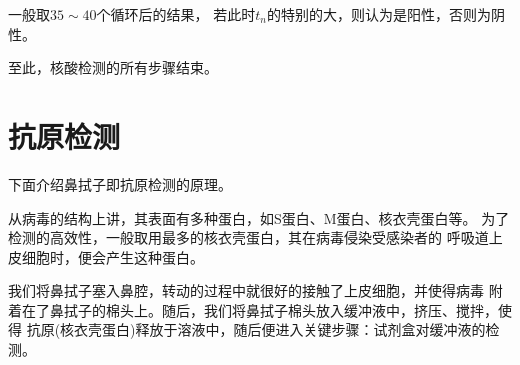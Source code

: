 \documentclass[UTF8,a4paper,11 pt]{ctexart}
\begin{document}
	一般取$35\sim 40$个循环后的结果，
	若此时$t_n$的特别的大，则认为是阳性，否则为阴性。
	
	至此，核酸检测的所有步骤结束。
	\part{抗原检测}
	
	下面介绍鼻拭子即抗原检测的原理。
	
	从病毒的结构上讲，其表面有多种蛋白，如S蛋白、M蛋白、核衣壳蛋白等。
	为了检测的高效性，一般取用最多的核衣壳蛋白，其在病毒侵染受感染者的
	呼吸道上皮细胞时，便会产生这种蛋白。
	
	我们将鼻拭子塞入鼻腔，转动的过程中就很好的接触了上皮细胞，并使得病毒
	附着在了鼻拭子的棉头上。随后，我们将鼻拭子棉头放入缓冲液中，挤压、搅拌，使得
	抗原(核衣壳蛋白)释放于溶液中，随后便进入关键步骤：试剂盒对缓冲液的检测。
	
\end{document}
